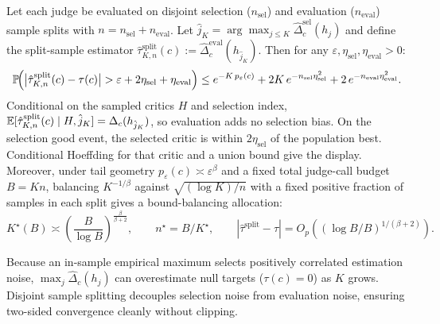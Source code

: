 \begin{theorem}
\label{thm:split-sample}
Let each judge be evaluated on disjoint selection ($n_{\mathrm{sel}}$) and
evaluation ($n_{\mathrm{eval}}$) sample splits with $n = n_{\mathrm{sel}} +
n_{\mathrm{eval}}$. Let $\hat{j}_K = \arg\max_{j \le K} \widehat\Delta^{\mathrm{sel}}_c(h_j)$
and define the split-sample estimator
$\hat\tau^{\mathrm{split}}_{K,n}(c) := \widehat\Delta^{\mathrm{eval}}_c(h_{\hat{j}_K})$.
Then for any $\varepsilon, \eta_{\mathrm{sel}}, \eta_{\mathrm{eval}} > 0$:
\begin{equation}
\label{eq:split-sample}
\mathbb{P}\!\Big(\big|\hat\tau^{\mathrm{split}}_{K,n}(c) - \tau(c)\big|
> \varepsilon + 2\eta_{\mathrm{sel}} + \eta_{\mathrm{eval}}\Big)
\le e^{-K\,p_\varepsilon(c)}
 + 2K\,e^{-n_{\mathrm{sel}}\eta_{\mathrm{sel}}^2}
 + 2\,e^{-n_{\mathrm{eval}}\eta_{\mathrm{eval}}^2}.
\end{equation}
Conditional on the sampled critics $H$ and selection index, $\mathbb{E}[\hat\tau^{\mathrm{split}}_{K,n}(c) \mid H,\hat{j}_K]
= \Delta_c(h_{\hat{j}_K})$, so evaluation adds no selection bias.
On the selection good event, the selected critic is within $2\eta_{\mathrm{sel}}$ of the population best.
Conditional Hoeffding for that critic and a union bound give the display.
Moreover, under tail geometry $p_\varepsilon(c) \asymp \varepsilon^\beta$ and a
fixed total judge-call budget $B = K n$, balancing $K^{-1/\beta}$ against
$\sqrt{(\log K)/n}$ with a fixed positive fraction of samples in each split gives a bound-balancing allocation:
\begin{equation}
K^\star(B) \asymp \left(\frac{B}{\log B}\right)^{\frac{\beta}{\beta+2}},
\qquad
n^\star=B/K^\star,\qquad
|\hat\tau^{\mathrm{split}}-\tau| = O_p\!\left((\log B/B)^{1/(\beta+2)}\right).
\end{equation}
\end{theorem}

\begin{remark}
Because an in-sample empirical maximum selects positively correlated estimation
noise, $\max_j \widehat\Delta_c(h_j)$ can overestimate null targets
($\tau(c) = 0$) as $K$ grows. Disjoint sample splitting decouples selection noise
from evaluation noise, ensuring two-sided convergence cleanly without clipping.
\end{remark}
